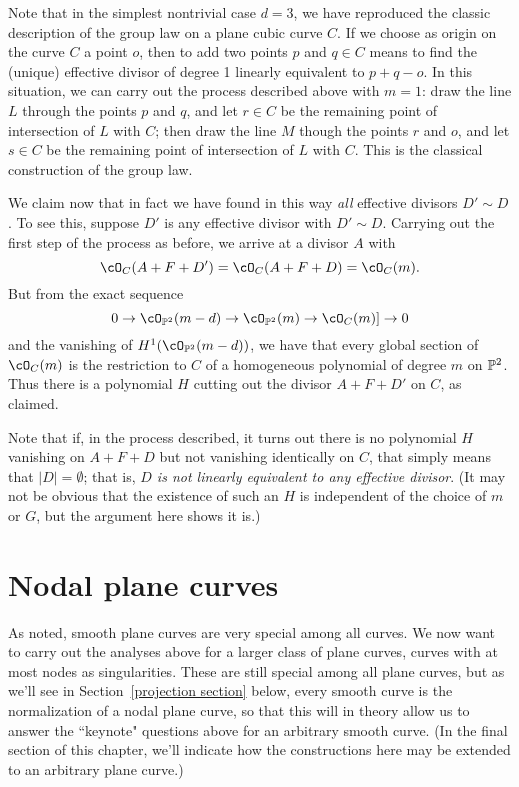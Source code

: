 Note that in the simplest nontrivial case $d=3$, we have reproduced the classic description of the group law on a plane cubic curve $C$. If we choose as origin on the curve $C$ a point $o$, then to add two points $p$ and $q \in C$ means to find the (unique) effective divisor of degree 1 linearly equivalent to $p + q - o$. In this situation, we can carry out the process described above with $m=1$: draw the line $L$ through the points $p$ and $q$, and let $r \in C$ be the remaining point of intersection of $L$ with $C$; then draw the line $M$ though the points $r$ and $o$, and let $s \in C$ be the remaining point of intersection of $L$ with $C$. This is the classical construction of the group law.

We claim now that in fact we have found in this way \emph{all} effective divisors $D' \sim D$. To see this, suppose $D'$ is any effective divisor with $D' \sim D$. Carrying out the first step of the process as before, we arrive at a divisor $A$ with 
$$
\cO_C(A+F+D') = \cO_C(A+F+D)  = \cO_C(m).
$$
But from the exact sequence 
$$
0 \to \cO_{\PP^2}(m-d) \to \cO_{\PP^2}(m)  \to \cO_C(m) ]\to 0
$$
and the vanishing of $H^1(\cO_{\PP^2}(m-d))$, we have that every global section of $ \cO_C(m)$ is the restriction to $C$ of a homogeneous polynomial of degree $m$ on $\PP^2$. Thus there is a polynomial $H$ cutting out the divisor $A+F+D'$ on $C$, as claimed.

Note that if, in the process described, it turns out there is no polynomial $H$ vanishing on  $A + F + D$ but not vanishing identically on $C$, that simply means that $|D| = \emptyset$; that is, \emph{$D$ is not linearly equivalent to any effective divisor}. (It may not be obvious that the existence of such an $H$ is independent of the choice of $m$ or $G$, but the argument here shows it is.)

\section{Nodal plane curves}\label{nodal plane curves}

As noted, smooth plane curves are very special among all curves. We now want to carry out the analyses above for a larger class of plane curves, curves with at most nodes as singularities. These are still special among all plane curves, but as we'll see in Section~\ref{projection section} below, every smooth curve is the normalization of a nodal plane curve, so that this will in theory allow us to answer the ``keynote" questions above for an arbitrary smooth curve. (In the final section of this chapter, we'll indicate how the constructions here may be extended to an arbitrary plane curve.)

